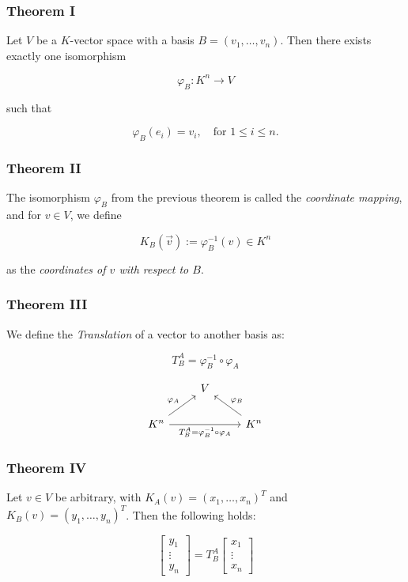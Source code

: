\subsubsection{Theorem I} 

Let \( V \) be a \( K \)-vector space with a basis \( B = (v_1, \ldots, v_n) \).  
Then there exists exactly one isomorphism 

\[
    \varphi_B : K^n \to V
\]

such that

\[
    \varphi_B(e_i) = v_i, \quad \text{for } 1 \leq i \leq n.
\]

\subsubsection{Theorem II} 

The isomorphism \( \varphi_B \) from the previous theorem is called the \emph{coordinate mapping},  
and for \( v \in V \), we define

\[
    K_B (\vec{v}) := \varphi_B^{-1} (v) \in K^n
\]

as the \emph{coordinates of \( v \) with respect to \(B\)}.

\subsubsection{Theorem III} 

We define the \emph{Translation} of a vector to another basis as:

\[
    T_{B}^{A} = \varphi_{B}^{-1} \circ \varphi_A
\]

\[
    \begin{tikzcd}
    & V & \\
    K^n \arrow[ur, "\varphi_A"] \arrow[rr, "T_{B}^{A} = \varphi_B^{-1} \circ \varphi_A"'] & & K^n \arrow[ul, "\varphi_B"']
    \end{tikzcd}
\]

\subsubsection{Theorem IV} 

Let \( v \in V \) be arbitrary, with \( K_A(v) = {(x_1, \dots, x_n)}^T \) 
and \( K_B(v) = {(y_1, \dots, y_n)}^T \).  Then the following holds:

\[
    \begin{bmatrix}
    y_1 \\
    \vdots \\
    y_n
    \end{bmatrix}
    =
    T_B^A
    \begin{bmatrix}
    x_1 \\
    \vdots \\
    x_n
    \end{bmatrix}
\]

